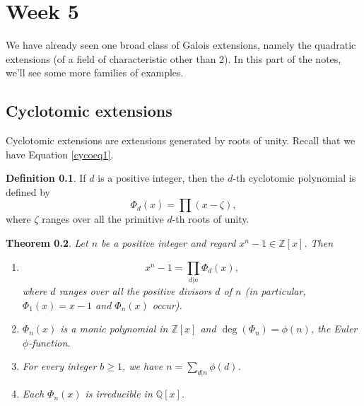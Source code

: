 \documentclass[12pt]{report}
\newtheorem{thm}{Theorem}[section]
\theoremstyle{definition}
\newtheorem{defn}[thm]{Definition}
\def\ZZ{\mathbb{Z}}
\def\QQ{\mathbb{Q}}
\begin{document}
\chapter*{Week 5}
\setcounter{chapter}{5}

We have already seen one broad class of Galois extensions, namely the quadratic extensions (of a field of characteristic other than 2). In this part of the notes, we'll see some more families of examples.

\section{Cyclotomic extensions}
Cyclotomic extensions are extensions generated by roots of unity. Recall that we have Equation \ref{cycoeq1}.

\begin{defn}
    If $d$ is a positive integer, then the $d$-th cyclotomic polynomial is defined by $$\Phi_d(x) =\prod (x - \zeta),$$ where $\zeta$ ranges over all the primitive $d$-th roots of unity.
\end{defn}

\begin{thm}
    Let $n$ be a positive integer and regard $x^n - 1 \in  \ZZ[x]$. Then
    \begin{enumerate}
        \item $$x^n-1 = \prod_{d|n} \Phi_d(x),$$ where $d$ ranges over all the positive divisors $d$ of $n$ (in particular, $\Phi_1(x) = x - 1$ and $\Phi_n(x)$ occur).
        \item $\Phi_n(x)$ is a monic polynomial in $\ZZ[x]$ and $\deg(\Phi_n) = \phi(n)$, the Euler $\phi$-function.
        \item For every integer $b\geq 1$, we have $n=\sum_{d|n} \phi(d)$.
        \item Each $\Phi_n(x)$ is irreducible in $\QQ[x]$.
    \end{enumerate}
\end{thm}
\end{document}
